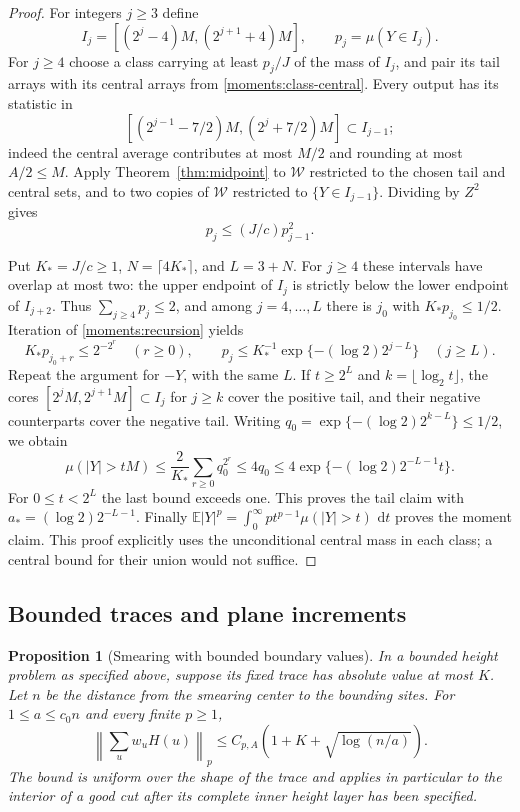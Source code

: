 \documentclass[11pt]{article}
\newcommand{\E}{\mathbb E}
\newcommand{\dd}{\,\mathrm d}
\newtheorem{proposition}[theorem]{Proposition}
\theoremstyle{definition}
\theoremstyle{remark}
\numberwithin{equation}{section}
\begin{document}
\begin{proof}
For integers $j\geq3$ define
\[
 I_j=[(2^j-4)M,(2^{j+1}+4)M],\qquad p_j=\mu(Y\in I_j).
\]
For $j\geq4$ choose a class carrying at least $p_j/J$ of the mass of
$I_j$, and pair its tail arrays with its central arrays from
\eqref{moments:class-central}.  Every output has its statistic in
\[
 [(2^{j-1}-7/2)M,(2^j+7/2)M]\subset I_{j-1};
\]
indeed the central average contributes at most $M/2$ and rounding at
most $A/2\leq M$.  Apply Theorem~\ref{thm:midpoint} to $\mathcal W$ restricted
to the chosen tail and central sets, and to two copies of $\mathcal W$ restricted
to $\{Y\in I_{j-1}\}$.  Dividing by $Z^2$ gives
\begin{equation}\label{moments:recursion}
 p_j\leq (J/c)p_{j-1}^2.
\end{equation}

Put $K_*=J/c\geq1$, $N=\lceil4K_*\rceil$, and $L=3+N$.
For $j\geq4$ these intervals have overlap at most two: the upper
endpoint of $I_j$ is strictly below the lower endpoint of $I_{j+2}$.
Thus $\sum_{j\geq4}p_j\leq2$, and among $j=4,\ldots,L$ there is
$j_0$ with $K_*p_{j_0}\leq1/2$.  Iteration of
\eqref{moments:recursion} yields
\[
 K_*p_{j_0+r}\leq2^{-2^r}\quad(r\geq0),
 \qquad
 p_j\leq K_*^{-1}
 \exp\{- (\log2)2^{j-L}\}\quad(j\geq L).
\]
Repeat the argument for $-Y$, with the same $L$.  If $t\geq2^L$ and
$k=\lfloor\log_2t\rfloor$, the cores
$[2^jM,2^{j+1}M]\subset I_j$ for $j\geq k$ cover the positive tail,
and their negative counterparts cover the negative tail.  Writing
$q_0=\exp\{-(\log2)2^{k-L}\}\leq1/2$, we obtain
\[
 \mu(|Y|>tM)
 \leq\frac2{K_*}\sum_{r\geq0}q_0^{2^r}
 \leq4q_0
 \leq4\exp\{- (\log2)2^{-L-1}t\}.
\]
For $0\leq t<2^L$ the last bound exceeds one.  This proves the tail
claim with $a_*=(\log2)2^{-L-1}$.  Finally
$\E|Y|^p=\int_0^\infty pt^{p-1}\mu(|Y|>t)\,\dd t$ proves the moment
claim.  This proof explicitly uses the unconditional central mass in
each class; a central bound for their union would not suffice.
\end{proof}

\subsection{Bounded traces and plane increments}

\begin{proposition}[Smearing with bounded boundary values]
\label{prop:smearing}
In a bounded height problem as specified above, suppose its fixed trace
has absolute value at most $K$.  Let $n$ be the distance from the
smearing center to the bounding sites.  For
$1\leq a\leq c_0n$ and every finite $p\geq1$,
\begin{equation}\label{moments:smearing-bound}
 \left\|\sum_uw_uH(u)\right\|_p
 \leq C_{p,A}\left(1+K+\sqrt{\log(n/a)}\right).
\end{equation}
The bound is uniform over the shape of the trace and applies in
particular to the interior of a good cut after its complete inner
height layer has been specified.
\end{proposition}
\end{document}
